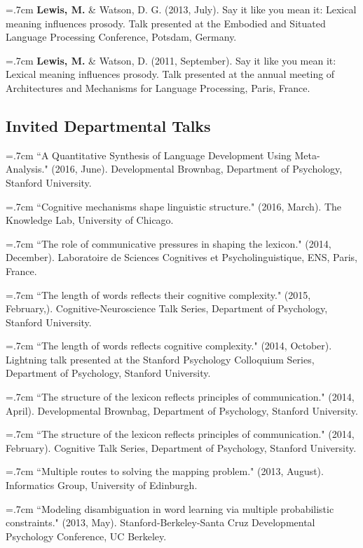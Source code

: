 \documentclass[letterpaper]{article}
\begin{document}
  \hangindent=.7cm {\bf Lewis, M.} \& Watson, D. G.  (2013, July). Say it like you mean it: Lexical meaning influences prosody. Talk presented at the Embodied and Situated Language Processing Conference, Potsdam, Germany.
 

 \hangindent=.7cm {\bf Lewis, M.}  \& Watson, D. (2011, September). Say it like you mean it: Lexical meaning influences prosody. Talk presented at the annual meeting of Architectures and Mechanisms for Language Processing, Paris, France.
 

\subsection*{Invited Departmental Talks}

\hangindent=.7cm ``A Quantitative Synthesis of Language Development Using Meta-Analysis." (2016, June). Developmental Brownbag, Department of Psychology,  Stanford University.

\hangindent=.7cm  ``Cognitive mechanisms shape linguistic structure."  (2016, March). The Knowledge Lab, University of Chicago.

\hangindent=.7cm ``The role of communicative pressures in shaping the lexicon." (2014, December). Laboratoire de Sciences Cognitives et Psycholinguistique, ENS, Paris, France.


\hangindent=.7cm ``The length of words reflects their cognitive complexity." (2015, February,). Cognitive-Neuroscience Talk Series, Department of Psychology, Stanford University.

\hangindent=.7cm ``The length of words reflects cognitive complexity." (2014, October). Lightning talk presented at the Stanford Psychology Colloquium Series, Department of Psychology, Stanford University.


\hangindent=.7cm ``The structure of the lexicon reflects principles of communication." (2014, April). Developmental Brownbag, Department of Psychology, Stanford University.

\hangindent=.7cm ``The structure of the lexicon reflects principles of communication." (2014, February). Cognitive Talk Series, Department of Psychology, Stanford University.

\hangindent=.7cm ``Multiple routes to solving the mapping problem." (2013, August). Informatics Group, University of Edinburgh.
 
\hangindent=.7cm ``Modeling disambiguation in word learning via multiple probabilistic constraints." (2013, May). Stanford-Berkeley-Santa Cruz Developmental Psychology Conference, UC Berkeley.
\end{document}
